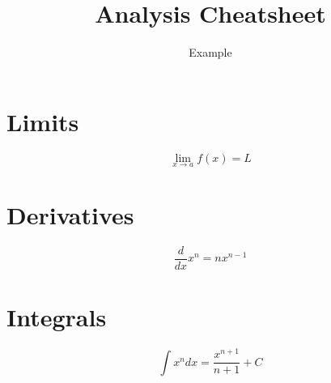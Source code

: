 \documentclass{article}
\title{Analysis Cheatsheet}
\author{Example}
\date{}
\begin{document}
\maketitle

\section{Limits}

\[
\lim_{x \to a} f(x) = L
\]

\section{Derivatives}

\[
\frac{d}{dx} x^n = nx^{n-1}
\]

\section{Integrals}

\[
\int x^n dx = \frac{x^{n+1}}{n+1} + C
\]
\end{document}
